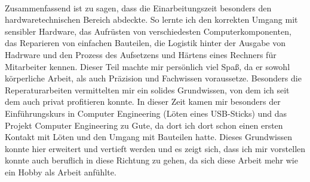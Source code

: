 \
\\
Zusammenfassend ist zu sagen, dass die Einarbeitungszeit besonders den hardwaretechnischen Bereich abdeckte. So lernte ich den korrekten Umgang mit sensibler Hardware, das Aufrüsten von verschiedesten Computerkomponenten, das Reparieren von einfachen Bauteilen, die Logistik hinter der Ausgabe von Hadrware und den Prozess des Aufsetzens und Härtens eines Rechners für Mitarbeiter kennen. Dieser Teil machte mir persönlich viel Spaß, da er sowohl körperliche Arbeit, als auch Präzision und Fachwissen voraussetze. Besonders die Reperaturarbeiten vermittelten mir ein solides Grundwissen, von dem ich seit dem auch privat profitieren konnte. In dieser Zeit kamen mir besonders der Einführungskurs in Computer Engineering (Löten eines USB-Sticks) und das Projekt Computer Engineering zu Gute, da dort ich dort schon einen ersten Kontakt mit Löten und den Umgang mit Bauteilen hatte. Dieses Grundwissen konnte hier erweitert und vertieft werden und es zeigt sich, dass ich mir vorstellen konnte auch beruflich in diese Richtung zu gehen, da sich diese Arbeit mehr wie ein Hobby als Arbeit anfühlte. 